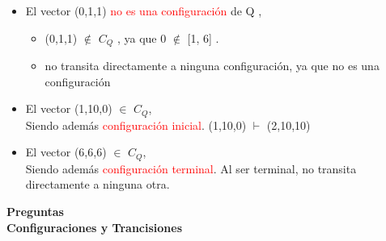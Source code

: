 \documentclass[xcolor=table]{beamer}
\begin{document}
\begin{frame}[fragile]
\begin{itemize}
 \item El vector (0,1,1) \textcolor{red}{no es una configuración}  de Q ,
        \begin{itemize}   \tiny
            \item (0,1,1) $\notin$ $C_Q$ , ya que 0 $\notin$ [1, 6] .
            \item  no transita directamente a ninguna configuración, ya que no es una configuración
        \end{itemize}

    \item El vector (1,10,0) $\in$ $C_Q$, \\
      \hspace{0.3cm}      \tiny Siendo además \textcolor{red}{configuración inicial}. (1,10,0) $\vdash$  (2,10,10)
            
       \scriptsize     
    \item El vector (6,6,6) $\in$ $C_Q$,\\
      \hspace{0.3cm}       \tiny Siendo además  \textcolor{red}{configuración terminal}. Al ser terminal, no transita directamente a ninguna otra.
        
\end{itemize}

\end{frame}

\begin{frame}  \Large

\begin{center}
    \textbf{Preguntas\\
    Configuraciones y Trancisiones}
\end{center}

\end{frame} 
\end{document}
